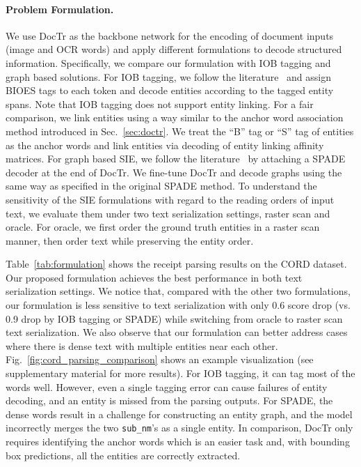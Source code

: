 \paragraph{Problem Formulation.} We use DocTr as the backbone network for the encoding of document inputs (image and OCR words) and apply different formulations to decode structured information. Specifically, we compare our formulation with IOB tagging and graph based solutions. For IOB tagging, we follow the literature~\cite{lee2022formnet,xu2020layoutlm} and assign BIOES tags to each token and decode entities according to the tagged entity spans. Note that IOB tagging does not support entity linking. For a fair comparison, we link entities using a way similar to the anchor word association method introduced in Sec.~\ref{sec:doctr}. We treat the ``B'' tag or ``S'' tag of entities as the anchor words and link entities via decoding of entity linking affinity matrices. For graph based SIE, we follow the literature~\cite{hong2021bros,hwang2020spatial} by attaching a SPADE~\cite{hwang2020spatial} decoder at the end of DocTr. We fine-tune DocTr and decode graphs using the same way as specified in the original SPADE method. To understand the sensitivity of the SIE formulations with regard to the reading orders of input text, we evaluate them under two text serialization settings, raster scan and oracle. For oracle, we first order the ground truth entities in a raster scan manner, then order text while preserving the entity order.

Table~\ref{tab:formulation} shows the receipt parsing results on the CORD dataset. Our proposed formulation achieves the best performance in both text serialization settings. We notice that, compared with the other two formulations, our formulation is less sensitive to text serialization with only 0.6 score drop (vs. 0.9 drop by IOB tagging or SPADE) while switching from oracle to raster scan text serialization. We also observe that our formulation can better address cases where there is dense text with multiple entities near each other. Fig.~\ref{fig:cord_parsing_comparison} shows an example visualization (see supplementary material for more results). For IOB tagging, it can tag most of the words well. However, even a single tagging error can cause failures of entity decoding, and an entity is missed from the parsing outputs. For SPADE, the dense words result in a challenge for constructing an entity graph, and the model incorrectly merges the two \texttt{sub\_nm}'s as a single entity. In comparison, DocTr only requires identifying the anchor words which is an easier task and, with bounding box predictions, all the entities are correctly extracted.

